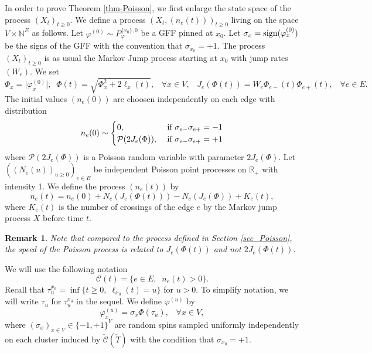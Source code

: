 \documentclass[11pt,a4paper]{amsart}
\numberwithin{equation}{section}
\newtheorem{remark}[proposition]{Remark}
\def\ccc{{\mathcal C}}
\def\R{{\mathbb R}}
\begin{document}
In order to prove Theorem \ref{thm-Poisson}, we first enlarge the state space of the process $(X_t)_{t\ge 0}$. We define a process
$(X_t,(n_e(t)))_{t\ge 0}$ living on the space $V\times {\mathbb N}^E$ as follows. Let 
$\varphi^{(0)}\sim P_{\varphi}^{\{x_0\},0}$ be a GFF pinned at $x_0$.
Let $\sigma_x=\hbox{sign}(\varphi^{(0)}_x)$ be the signs of the GFF with the convention that $\sigma_{x_0}=+1$.
The process $(X_t)_{t\ge 0}$ is as usual the Markov Jump process starting at $x_0$ with jump rates $(W_e)$. We set
\begin{equation}
\label{Phi-J}
\Phi_x=\vert\varphi^{(0)}_x\vert, \;\; \Phi(t)=\sqrt{\Phi_x^2+2\ell_x(t)}, \;\;\;\forall x\in V, \;\;\; J_e(\Phi(t))=W_e \Phi_{e-}(t)\Phi_{e+}(t), \;\;\; \forall e\in E.
\end{equation}
The initial values $(n_e(0))$ are choosen independently on each edge with distribution
$$
n_e(0)\sim
\begin{cases}
0,& \hbox{ if $\sigma_{e-}\sigma_{e+}=-1$}
\\
\mathcal{P}(2J_e(\Phi)),& \hbox{ if $\sigma_{e-}\sigma_{e+}=+1$}
\end{cases}
$$
where ${\mathcal{P}}(2J_e(\Phi))$ is a Poisson random variable with parameter $2J_e(\Phi)$. Let $((N_e(u))_{u\ge 0})_{e\in E}$ be independent Poisson point processes 
on $\R_+$ with intensity 1. We define the process $(n_e(t))$ by
$$
n_e(t)=n_e(0)+N_e(J_e(\Phi(t)))-N_e(J_e(\Phi))+K_e(t),
$$
where $K_e(t)$ is the number of crossings of the edge $e$ by the Markov jump process $X$ before time $t$.
\begin{remark}
Note that compared to the process defined in Section \ref{sec_Poisson}, the speed of the Poisson process is related to $J_e(\Phi(t))$ and not $2J_e(\Phi(t))$.
\end{remark}
We will use the following notation
$$
\ccc(t)=\{e\in E, \;\; n_e(t)>0\}.
$$
Recall that $\tau_u^{x_0}=\inf\{t\ge 0, \; \ell_{x_0}(t)=u\}$ for $u>0$. To simplify notation, we will write $\tau_u$ for $\tau_u^{x_0}$ in the sequel.
We define $\varphi^{(u)}$ by
$$
\varphi^{(u)}_x=\sigma_x\Phi(\tau_u), \;\;\; \forall x\in V,
$$
where  $(\sigma_x)_{x\in V}\in \lbrace -1,+1\rbrace^{V}$ are random spins sampled uniformly independently on 
each cluster induced by $\check\ccc(\check T)$ with the condition that $\sigma_{x_0}=+1$.
\end{document}
